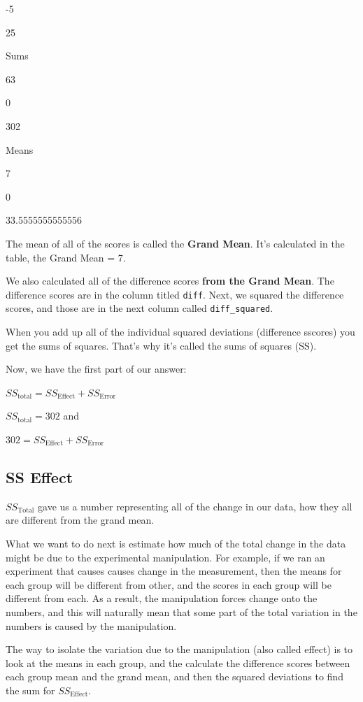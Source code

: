 \documentclass[]{book}
\begin{document}
-5

25

Sums

63

0

302

Means

7

0

33.5555555555556

The mean of all of the scores is called the \textbf{Grand Mean}. It's calculated in the table, the Grand Mean = 7.

We also calculated all of the difference scores \textbf{from the Grand Mean}. The difference scores are in the column titled \texttt{diff}. Next, we squared the difference scores, and those are in the next column called \texttt{diff\_squared}.

When you add up all of the individual squared deviations (difference sscores) you get the sums of squares. That's why it's called the sums of squares (SS).

Now, we have the first part of our answer:

\(SS_\text{total} = SS_\text{Effect} + SS_\text{Error}\)

\(SS_\text{total} = 302\) and

\(302 = SS_\text{Effect} + SS_\text{Error}\)

\hypertarget{ss-effect}{%
\subsection{SS Effect}\label{ss-effect}}

\(SS_\text{Total}\) gave us a number representing all of the change in our data, how they all are different from the grand mean.

What we want to do next is estimate how much of the total change in the data might be due to the experimental manipulation. For example, if we ran an experiment that causes causes change in the measurement, then the means for each group will be different from other, and the scores in each group will be different from each. As a result, the manipulation forces change onto the numbers, and this will naturally mean that some part of the total variation in the numbers is caused by the manipulation.

The way to isolate the variation due to the manipulation (also called effect) is to look at the means in each group, and the calculate the difference scores between each group mean and the grand mean, and then the squared deviations to find the sum for \(SS_\text{Effect}\).
\end{document}
